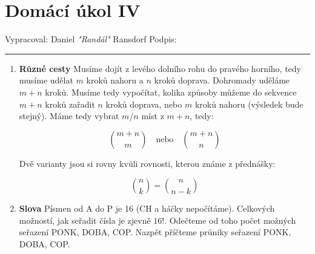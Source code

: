 \documentclass[12pt]{article}
\begin{document}
\section*{Domácí úkol IV}

Vypracoval: Daniel \textit{"Randál"} Ransdorf \hfill Podpis: \rule{4cm}{0.4pt}

\begin{enumerate}
  \item \textbf{Různé cesty}
    Musíme dojít z levého dolního rohu do pravého horního, tedy musíme udělat
    $m$ kroků nahoru a $n$ kroků doprava. Dohromady uděláme $m+n$ kroků.
    Musíme tedy vypočítat, kolika způsoby můžeme do sekvence $m+n$ kroků
    zařadit $n$ kroků doprava, nebo $m$ kroků nahoru (výsledek bude stejný).
    Máme tedy vybrat $m$/$n$ míst z $m+n$, tedy:

    \[ \binom{m+n}{m} \quad \text{nebo} \quad \binom{m+n}{n}\]

    Dvě varianty jsou si rovny kvůli rovnosti, kterou známe z přednášky:

    \[ \binom{n}{k} = \binom{n}{n-k} \]
  
  \item \textbf{Slova}
    Písmen od A do P je 16 (CH a háčky nepočítáme). 
    Celkových možností, jak seřadit čísla je zjevně $16!$.
    Odečteme od toho počet možných seřazení PONK, DOBA, COP.
    Nazpět příčteme průniky seřazení PONK, DOBA, COP.


\end{enumerate}
\end{document}
